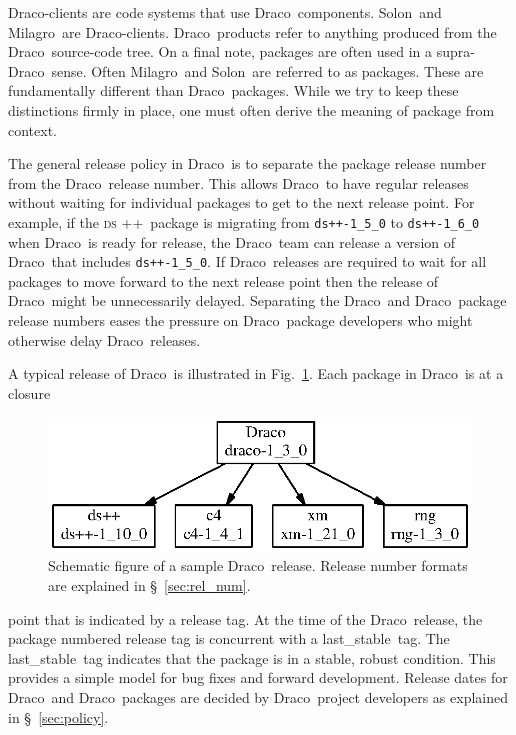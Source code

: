 \documentclass[11pt]{nmemo}
\newcommand{\draco}{{\normalfont\normalsize\sffamily Draco}}
\newcommand{\milagro}{{\normalfont\normalsize\sffamily Milagro}}
\newcommand{\solon}{{\normalfont\normalsize\sffamily Solon}}
\newcommand{\dsxx}{{\normalfont\normalsize\scshape ds\raisebox{.2ex}
  {\scriptsize ++}}}
\newcommand{\stable}{{\normalfont\normalsize\ttfamily last\_stable}}
\begin{document}
\draco-clients are code systems that use \draco\ components.  \solon\ 
and \milagro\ are \draco-clients.  \draco\ products refer to anything
produced from the \draco\ source-code tree.  On a final note, packages
are often used in a supra-\draco\ sense.  Often \milagro\ and \solon\ 
are referred to as packages.  These are fundamentally different than
\draco\ packages.  While we try to keep these distinctions firmly in
place, one must often derive the meaning of package from context.

The general release policy in \draco\ is to separate the package
release number from the \draco\ release number.  This allows \draco\ 
to have regular releases without waiting for individual packages to
get to the next release point.  For example, if the \dsxx\ package is
migrating from \texttt{ds++-1\_5\_0} to \texttt{ds++-1\_6\_0} when
\draco\ is ready for release, the \draco\ team can release a version
of \draco\ that includes \texttt{ds++-1\_5\_0}.  If \draco\ releases
are required to wait for all packages to move forward to the next
release point then the release of \draco\ might be unnecessarily
delayed.  Separating the \draco\ and \draco\ package release numbers
eases the pressure on \draco\ package developers who might otherwise
delay \draco\ releases.

A typical release of \draco\ is illustrated in
Fig.~\ref{fig:drelease}.  Each package in \draco\ is at a closure
\begin{figure}
  \centerline{\includegraphics{drelease.eps}}
  \caption{Schematic figure of a sample \draco\ release.  Release
    number formats are explained in \S~\ref{sec:rel_num}.}
  \label{fig:drelease}
\end{figure}
point that is indicated by a release tag. At the time of the \draco\ 
release, the package numbered release tag is concurrent with a
\stable\ tag.  The \stable\ tag indicates that the package is in a
stable, robust condition.  This provides a simple model for bug fixes
and forward development.  Release dates for \draco\ and \draco\ 
packages are decided by \draco\ project developers as explained in
\S~\ref{sec:policy}.
\end{document}
